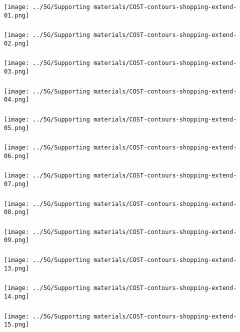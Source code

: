 \begin{frame}\frametitle{}
	\centerline{\texttt{[image: ../5G/Supporting materials/COST-contours-shopping-extend-01.png]}}
\end{frame}
\begin{frame}\frametitle{}
	\centerline{\texttt{[image: ../5G/Supporting materials/COST-contours-shopping-extend-02.png]}}
\end{frame}
\begin{frame}\frametitle{}
	\centerline{\texttt{[image: ../5G/Supporting materials/COST-contours-shopping-extend-03.png]}}
\end{frame}
\begin{frame}\frametitle{}
	\centerline{\texttt{[image: ../5G/Supporting materials/COST-contours-shopping-extend-04.png]}}
\end{frame}
\begin{frame}\frametitle{}
	\centerline{\texttt{[image: ../5G/Supporting materials/COST-contours-shopping-extend-05.png]}}
\end{frame} 
\begin{frame}\frametitle{}
	\centerline{\texttt{[image: ../5G/Supporting materials/COST-contours-shopping-extend-06.png]}}
\end{frame}
\begin{frame}\frametitle{}
	\centerline{\texttt{[image: ../5G/Supporting materials/COST-contours-shopping-extend-07.png]}}
\end{frame}
\begin{frame}\frametitle{}
	\centerline{\texttt{[image: ../5G/Supporting materials/COST-contours-shopping-extend-08.png]}}
\end{frame}
\begin{frame}\frametitle{}
	\centerline{\texttt{[image: ../5G/Supporting materials/COST-contours-shopping-extend-09.png]}}
\end{frame}
\begin{frame}\frametitle{}
	\centerline{\texttt{[image: ../5G/Supporting materials/COST-contours-shopping-extend-13.png]}}
\end{frame}
\begin{frame}\frametitle{}
	\centerline{\texttt{[image: ../5G/Supporting materials/COST-contours-shopping-extend-14.png]}}
\end{frame}
\begin{frame}\frametitle{}
	\centerline{\texttt{[image: ../5G/Supporting materials/COST-contours-shopping-extend-15.png]}}
\end{frame}
